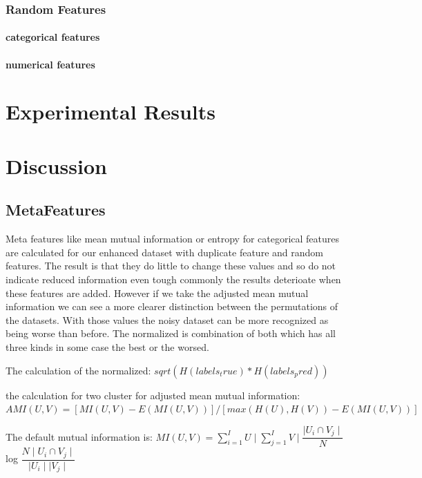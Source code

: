 \documentclass[a4paper,10pt]{article}
\begin{document}
\subsubsection{Random Features}
\paragraph{categorical features}

\paragraph{numerical features}

\newpage 

\section{Experimental Results} \label{Chapter4}



\section{Discussion} \label{Chapter5}


\subsection{MetaFeatures}
Meta features like mean mutual information or entropy for categorical features are calculated for our enhanced dataset with duplicate feature and random features. The result is that they do little to change these values and so do not indicate reduced information even tough commonly the results deterioate when these features are added. However if we take the adjusted mean mutual information we can see a more clearer distinction between the permutations of the datasets. With those values the noisy dataset can be more recognized as being worse than before. The normalized  is combination of both which has all three kinds in some case the best or the worsed.

The calculation of the normalized:
$sqrt(H(labels_true) * H(labels_pred))$


the calculation for two cluster for adjusted mean mutual information:
$AMI(U, V) = [MI(U, V) - E(MI(U, V))] / [max(H(U), H(V)) - E(MI(U, V))]$


The default mutual information is:
$MI(U,V) = \sum_{i = 1}^{I} U \mid\sum_{j = 1}^{I} V \mid \dfrac{\mid U_i \cap V_j\mid}{N} $log $\dfrac{N\mid U_i \cap V_j\mid}{\mid U_i\mid \mid V_j\mid}$
\end{document}
